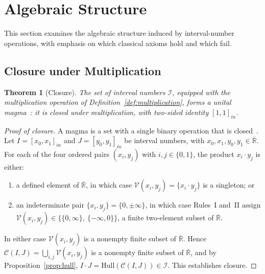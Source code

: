 \documentclass[11pt,a4paper]{article}
\theoremstyle{paperdef}
\newtheorem{theorem}{Theorem}[section]
\newcommand{\Rext}{\overline{\mathbb{R}}}
\newcommand{\Iset}{\mathcal{I}}
\newcommand{\inI}[1]{[#1]_{in}}
\newcommand{\V}{\mathcal{V}}
\newcommand{\Cand}{\mathcal{C}}
\begin{document}
\section{Algebraic Structure}\label{sec:algebraic-structure}

This section examines the algebraic structure induced by
interval-number operations, with emphasis on which classical axioms
hold and which fail.

\subsection{Closure under Multiplication}\label{sec:closure}

\begin{theorem}[Closure]\label{thm:closure}
The set of interval numbers $\Iset$, equipped with the multiplication
operation of Definition~\ref{def:multiplication}, forms a
\emph{unital magma}~\cite{MacLaneBirkhoff1999}: it is closed under
multiplication, with two-sided identity $\inI{1, 1}$.
\end{theorem}

\begin{proof}[Proof of closure]
A magma is a set with a single binary operation that is
closed~\cite{Bourbaki1989,MacLaneBirkhoff1999}. Let
$I = \inI{x_0, x_1}$ and $J = \inI{y_0, y_1}$ be interval numbers,
with $x_0, x_1, y_0, y_1 \in \Rext$. For each of the four ordered
pairs $(x_i, y_j)$ with $i, j \in \{0, 1\}$, the product
$x_i \cdot y_j$ is either:
\begin{enumerate}[label=(\alph*),leftmargin=2em]
  \item a defined element of $\Rext$, in which case
    $\V(x_i, y_j) = \{x_i \cdot y_j\}$ is a singleton; or
  \item an indeterminate pair $\{x_i, y_j\} = \{0, \pm\infty\}$, in
    which case Rules~I and~II assign
    $\V(x_i, y_j) \in \{\{0, \infty\},\ \{-\infty, 0\}\}$, a finite
    two-element subset of $\Rext$.
\end{enumerate}
In either case $\V(x_i, y_j)$ is a nonempty finite subset of $\Rext$.
Hence
$\Cand(I, J) = \bigcup_{i,j} \V(x_i, y_j)$ is a nonempty finite
subset of $\Rext$, and by Proposition~\ref{prop:hull},
$I \cdot J = \mathrm{Hull}(\Cand(I, J)) \in \Iset$. This establishes
closure.
\end{proof}
\end{document}
